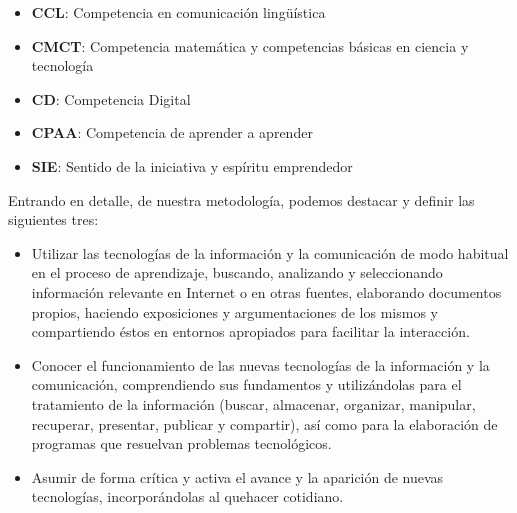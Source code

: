 \begin{itemize}
    \item \textbf{CCL}: Competencia en comunicación lingüística
    \item \textbf{CMCT}: Competencia matemática y competencias básicas en ciencia y tecnología
    \item \textbf{CD}: Competencia Digital
    \item \textbf{CPAA}: Competencia de aprender a aprender
    \item \textbf{SIE}: Sentido de la iniciativa y espíritu emprendedor
\end{itemize}

Entrando en detalle, de nuestra metodología, podemos destacar y definir las siguientes tres:

\begin{itemize}

    \item Utilizar las tecnologías de la información y la comunicación de modo habitual en el proceso de aprendizaje, buscando, analizando y seleccionando información relevante en Internet o en otras fuentes,  elaborando documentos propios, haciendo exposiciones y argumentaciones de los mismos y compartiendo éstos en entornos apropiados para facilitar la interacción.

    \item Conocer el funcionamiento de las nuevas tecnologías de la información y la comunicación, comprendiendo sus fundamentos y utilizándolas para el tratamiento de la información (buscar, almacenar, organizar, manipular, recuperar, presentar, publicar y compartir), así como para la elaboración de programas que resuelvan problemas tecnológicos.

    \item Asumir de forma crítica y activa el avance y la aparición de nuevas tecnologías, incorporándolas al quehacer cotidiano.

\end{itemize}




